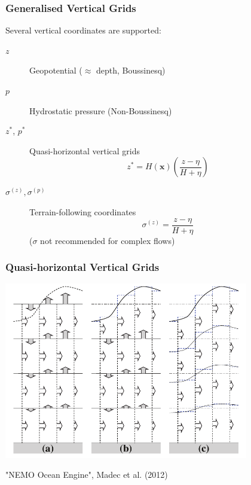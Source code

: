 \documentclass{beamer}
\begin{document}
\begin{frame}
    \frametitle{Generalised Vertical Grids}
    
    Several vertical coordinates are supported:
    \begin{description}
        \item[$z$] Geopotential ($\approx$ depth, Boussinesq)
        
        \item[$p$] Hydrostatic pressure (Non-Boussinesq)
        
        \item[$z^*$, $p^*$] Quasi-horizontal vertical grids
            $$
            z^* = H(\mathbf{x}) \left(\frac{z - \eta}{H + \eta}\right)
            $$
        \item[$\sigma^{(z)}, \sigma^{(p)}$] Terrain-following coordinates
            $$
            \sigma^{(z)} = \frac{z - \eta}{H + \eta}
            $$
            ($\sigma$ not recommended for complex flows)
    \end{description}
\end{frame}

\begin{frame}
    \frametitle{Quasi-horizontal Vertical Grids}
    
    \begin{center}
        \includegraphics[width=0.8\textwidth]{zstar.pdf}
    \end{center}
    
    {\tiny "NEMO Ocean Engine", Madec et al. (2012)}
\end{frame}
\end{document}
